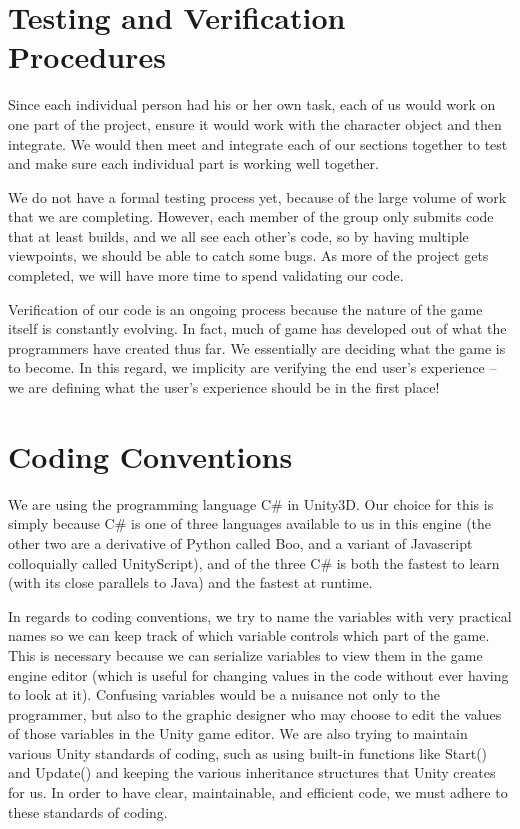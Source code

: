 \documentclass[10pt,letterpaper,oneside,english]{article}
\begin{document}
\section{Testing and Verification Procedures}
Since each individual person had his or her own task, each of us would work on one part of the project, ensure it would work with the character object and then integrate. We would then meet and integrate each of our sections together to test and make sure each individual part is working well together.

We do not have a formal testing process yet, because of the large volume of work that we are completing. However, each member of the group only submits code that at least builds, and we all see each other’s code, so by having multiple viewpoints, we should be able to catch some bugs. As more of the project gets completed, we will have more time to spend validating our code.

Verification of our code is an ongoing process because the nature of the game itself is constantly evolving. In fact, much of game has developed out of what the programmers have created thus far. We essentially are deciding what the game is to become. In this regard, we implicity are verifying the end user’s experience -- we are defining what the user’s experience should be in the first place! 

\section{Coding Conventions}
We are using the programming language C\# in Unity3D. Our choice for this is simply because C\# is one of three languages available to us in this engine (the other two are a derivative of Python called Boo, and a variant of Javascript colloquially called UnityScript), and of the three C\# is both the fastest to learn (with its close parallels to Java) and the fastest at runtime.

In regards to coding conventions, we try to name the variables with very practical names so we can keep track of which variable controls which part of the game. This is necessary because we can serialize variables to view them in the game engine editor (which is useful for changing values in the code without ever having to look at it). Confusing variables would be a nuisance not only to the programmer, but also to the graphic designer who may choose to edit the values of those variables in the Unity game editor. We are also trying to maintain various Unity standards of coding, such as using built-in functions like Start() and Update() and keeping the various inheritance structures that Unity creates for us. In order to have clear, maintainable, and efficient code, we must adhere to these standards of coding.
\end{document}
